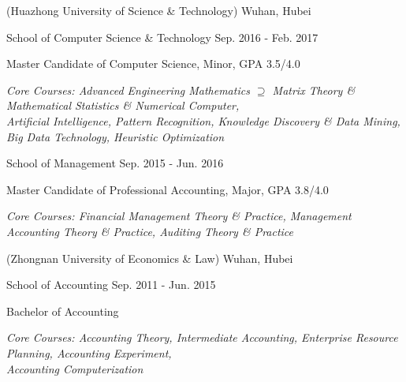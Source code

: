 \vspace{-5.0mm}

\begin{cventries}
\vspace{-1.5mm}
\cveducation
{(Huazhong University of Science \& Technology)}
{Wuhan, Hubei}

\cvsubeducation
{School of Computer Science \& Technology}
{Sep. 2016 - Feb. 2017}
{
    \begin{cvitems}
    \item {Master Candidate of Computer Science, Minor, GPA 3.5/4.0}
    \item {\itshape{Core Courses: Advanced Engineering Mathematics $\supseteq$ Matrix Theory \& Mathematical Statistics \& Numerical Computer,\\ 
    Artificial Intelligence, Pattern Recognition, Knowledge Discovery \& Data Mining, Big Data Technology, Heuristic Optimization}}
    \end{cvitems}
}
\vspace{-1.0mm}

\cvsubeducation
{School of Management}
{Sep. 2015 - Jun. 2016}
{
    \begin{cvitems}
    \item {Master Candidate of Professional Accounting, Major, GPA 3.8/4.0}
    \item {\itshape{Core Courses: Financial Management Theory \& Practice, Management Accounting Theory \& Practice, Auditing Theory \& Practice}}
    \end{cvitems}
}

\cveducation
{(Zhongnan University of Economics \& Law)}
{Wuhan, Hubei}

\cvsubeducation
{School of Accounting}
{Sep. 2011 - Jun. 2015}
{
    \begin{cvitems}
    \item {Bachelor of Accounting}
    \item {\itshape{Core Courses: Accounting Theory, Intermediate Accounting, Enterprise Resource Planning, Accounting Experiment, \\
    Accounting Computerization}}
    \end{cvitems}
}
\end{cventries}